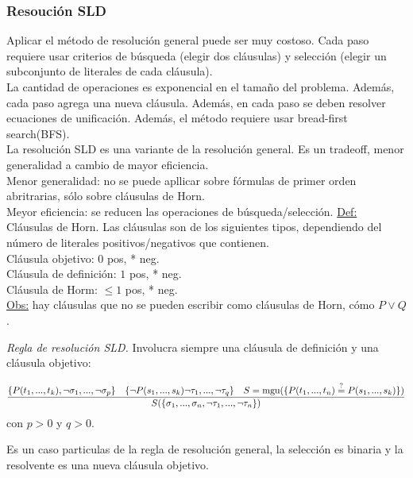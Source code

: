 \documentclass[12pt]{extarticle}
\def\definicion{\newline\underline{Def:} }
\def\observacion{\underline{Obs:} }
\def\equ{\overset{?}{=}}
\def\ssspace{\space\space\space}
\begin{document}
\subsubsection{Resoución SLD}
Aplicar el método de resolución general puede ser muy costoso. Cada paso requiere usar criterios de búsqueda (elegir dos cláusulas) y selección (elegir un subconjunto de literales de cada cláusula). \\
La cantidad de operaciones es exponencial en el tamaño del problema. Además, cada paso agrega una nueva cláusula. Además, en cada paso se deben resolver ecuaciones de unificación. Además, el método requiere usar bread-first search(BFS). \\
La resolución SLD es una variante de la resolución general. Es un tradeoff, menor generalidad a cambio de mayor eficiencia. \\
Menor generalidad: no se puede apllicar sobre fórmulas de primer orden abritrarias, sólo sobre cláusulas de Horn. \\
Meyor eficiencia: se reducen las operaciones de búsqueda/selección.
\definicion Cláusulas de Horn. Las cláusulas son de los siguientes tipos, dependiendo del número de literales positivos/negativos que contienen. \\
Cláusula objetivo: $0$ pos, * neg. \\
Cláusula de definición: $1$ pos, * neg. \\
Cláusula de Horm: $\leq 1$ pos, * neg. \\
\observacion hay cláusulas que no se pueden escribir como cláusulas de Horn, cómo $P \lor Q$.

\textit{Regla de resolución SLD.} 
Involucra siempre una cláusula de definición y una cláusula objetivo:

$$\frac{
  \{P(t_1,...,t_k),\neg\sigma_1,...,\neg\sigma_p\} 
  \text{\ssspace} 
  \{\neg P(s_1,...,s_k)\neg\tau_1,...,\neg\tau_q\} 
  \text{\ssspace} 
  S = \text{mgu}(\{P(t_1,...,t_n) \equ P(s_1,...,s_k)\})
}{
  S(\{\sigma_1,...,\sigma_n,\neg\tau_1,...,\neg\tau_n\})
}$$
con $p > 0$ y $q > 0$.

Es un caso particulas de la regla de resolución general, la selección es binaria y la resolvente es una nueva cláusula objetivo.
\end{document}
